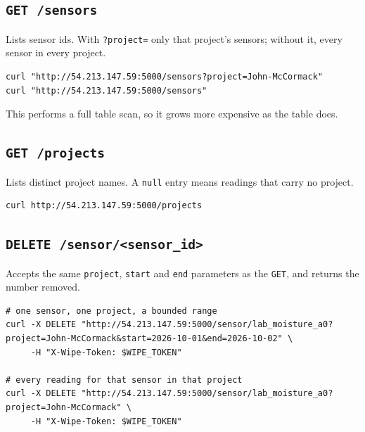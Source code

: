 \documentclass[11pt,a4paper]{article}
\newcommand{\http}[2]{\texttt{\textbf{#1}}~\texttt{#2}}
\begin{document}
\subsection{\http{GET}{/sensors}}

Lists sensor ids. With \texttt{?project=} only that project's sensors;
without it, every sensor in every project.

\begin{lstlisting}
curl "http://54.213.147.59:5000/sensors?project=John-McCormack"
curl "http://54.213.147.59:5000/sensors"
\end{lstlisting}

\noindent This performs a full table scan, so it grows more expensive as
the table does.

\subsection{\http{GET}{/projects}}

Lists distinct project names. A \texttt{null} entry means readings that
carry no project.

\begin{lstlisting}
curl http://54.213.147.59:5000/projects
\end{lstlisting}

\subsection{\http{DELETE}{/sensor/<sensor\_id>}}

\begin{center}\end{center}

\medskip
Accepts the same \texttt{project}, \texttt{start} and \texttt{end}
parameters as the \texttt{GET}, and returns the number removed.

\begin{lstlisting}
# one sensor, one project, a bounded range
curl -X DELETE "http://54.213.147.59:5000/sensor/lab_moisture_a0?project=John-McCormack&start=2026-10-01&end=2026-10-02" \
     -H "X-Wipe-Token: $WIPE_TOKEN"

# every reading for that sensor in that project
curl -X DELETE "http://54.213.147.59:5000/sensor/lab_moisture_a0?project=John-McCormack" \
     -H "X-Wipe-Token: $WIPE_TOKEN"
\end{lstlisting}
\end{document}
